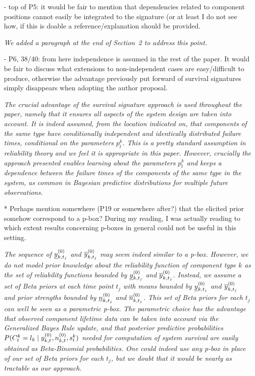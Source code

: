 \documentclass[12pt, a4paper]{elsarticle}
\begin{document}
- top of P5: it would be fair to mention that dependencies related to component positions cannot easily be integrated to the signature (or at least I do not see how, if this is doable a reference/explanation should be provided.

\medskip
\emph{We added a paragraph at the end of Section~2 to address this point.}
\medskip

- P6, 38/40: from here independence is assumed in the rest of the paper. It would be fair to discuss what extensions to non-independent cases are easy/difficult to produce, otherwise the advantage previously put forward of survival signatures simply disappears when adopting the author proposal.
 
\medskip
\emph{The crucial advantage of the survival signature approach is used throughout the paper, namely that it ensures all aspects of the system design are taken into account. It is indeed assumed, from the location indicated on, that components of the same type have conditionally independent and identically distributed failure times, conditional on the parameters $p_t^k$. This is a pretty standard assumption in reliability theory and we feel it is appropriate in this paper. However, crucially the approach presented enables learning about the parameters $p_t^k$ and keeps a dependence between the failure times of the components of the same type in the system, as common in Bayesian predictive distributions for multiple future observations.}
\medskip

* Perhaps mention somewhere (P19 or somewhere after?) that the elicited prior somehow correspond to a p-box? During my reading, I was actually reading to which extent results concerning p-boxes in general could not be useful in this setting.

\medskip
\emph{The sequence of $\underline{y}^{(0)}_{k,t_j}$ and $\overline{y}^{(0)}_{k,t_j}$ may seem indeed similar to a p-box.
However, we do not model prior knowledge about the reliability function of component type $k$
as the set of reliability functions bounded by $\underline{y}^{(0)}_{k,t_j}$ and $\overline{y}^{(0)}_{k,t_j}$.
Instead, we assume a set of Beta priors at each time point $t_j$ with means bounded by $\underline{y}^{(0)}_{k,t_j}$ and $\overline{y}^{(0)}_{k,t_j}$
and prior strengths bounded by $\underline{n}^{(0)}_{k,t_j}$ and $\overline{n}^{(0)}_{k,t_j}$.
This set of Beta priors for each $t_j$ can well be seen as a parametric p-box.
The parametric choice has the advantage that observed component lifetime data can be taken into account via the Generalized Bayes Rule update,
and that posterior predictive probabilities $P(C^k_t = l_k \mid y^{(0)}_{k,t}, n^{(0)}_{k,t}, s^k_t)$ needed for computation of system survival
are easily obtained as Beta-Binomial probabilities.
One could indeed use any p-box in place of our set of Beta priors for each $t_j$,
but we doubt that it would be nearly as tractable as our approach.}
\medskip
\end{document}

